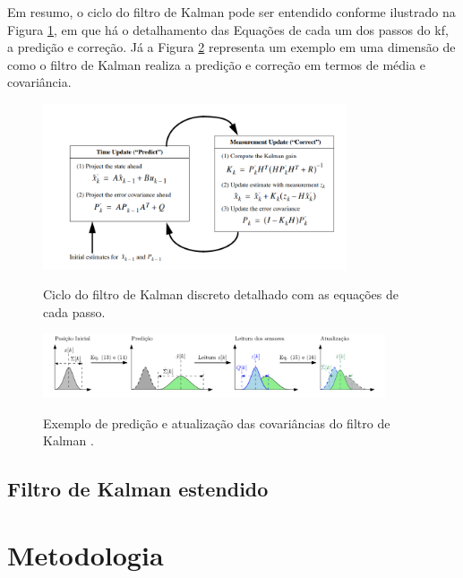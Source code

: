 \documentclass[acronym, symbols]{fei}
\begin{document}
				Em resumo, o ciclo do filtro de Kalman pode ser entendido conforme ilustrado na Figura \ref{fig:ciclo_filtro_de_kalman_equacoes}, em que há o detalhamento das Equações de cada um dos passos do \acrshort{kf}, a predição e correção. Já a Figura \ref{fig:exemplo_filtro_de_kalman_covariancias} representa um exemplo em uma dimensão de como o filtro de Kalman realiza a predição e correção em termos de média e covariância.
				
				\begin{figure}[!htb]
					\centering
					\caption{Ciclo do filtro de Kalman discreto detalhado com as equações de cada passo.} 
					\includegraphics[width=0.8\textwidth]{ciclo_filtro_de_kalman_equacoes.png}
					\label{fig:ciclo_filtro_de_kalman_equacoes}
				\end{figure}
			
				\begin{figure}[!htb]
					\centering
					\caption{Exemplo de predição e atualização das covariâncias do filtro de Kalman .}
					\includegraphics[width=0.9\textwidth]{exemplo_filtro_de_kalman.png}
					\label{fig:exemplo_filtro_de_kalman_covariancias}
				\end{figure}
		
		\section{Filtro de Kalman estendido}
			
\chapter{Metodologia}
\end{document}
